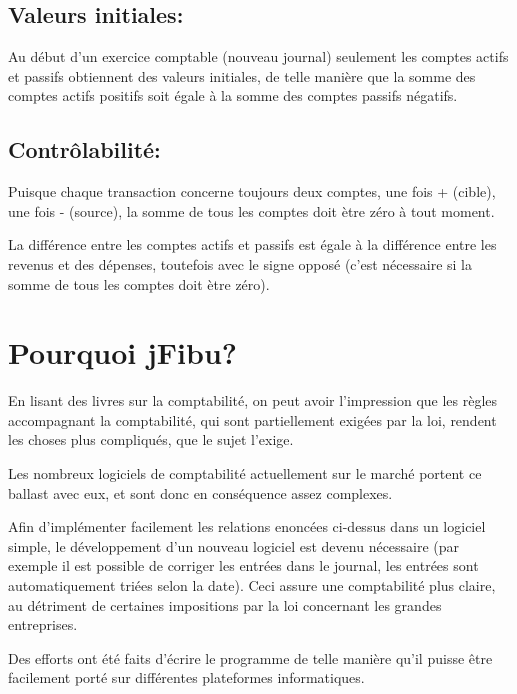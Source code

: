 \documentclass[12pt]{report}
\begin{document}
\subsection{Valeurs initiales:} 

Au début d'un exercice comptable (nouveau journal) seulement les comptes
actifs et passifs obtiennent des valeurs initiales, de telle manière que la
somme des comptes actifs positifs soit égale à la somme des comptes passifs
négatifs.  



\subsection{Contrôlabilité:} 

Puisque chaque transaction concerne toujours deux
comptes, une fois + (cible), une fois - (source), la somme de tous les comptes
doit ètre zéro à tout moment.

La différence entre les comptes actifs et passifs est égale à la différence
entre les revenus et des dépenses, toutefois avec le signe opposé (c'est
nécessaire si la somme de tous les comptes doit ètre zéro).



\section{Pourquoi jFibu?}

En lisant des livres sur la comptabilité, on peut avoir l'impression que les
règles accompagnant la comptabilité, qui sont partiellement exigées par la loi,
rendent les choses plus compliqués, que le sujet l'exige.

Les nombreux logiciels de comptabilité actuellement sur le marché portent ce ballast avec eux, et sont donc en conséquence assez complexes. 

Afin d'implémenter facilement les relations enoncées ci-dessus dans un logiciel
simple, le développement d'un nouveau logiciel est devenu nécessaire (par
exemple il est possible de corriger les entrées dans le journal, les entrées
sont automatiquement triées selon la date).  Ceci assure une  comptabilité plus
claire, au détriment de certaines impositions par la loi concernant les grandes entreprises.

Des efforts ont été faits d'écrire le programme de telle manière qu'il puisse
être facilement porté sur différentes plateformes informatiques.
\end{document}
